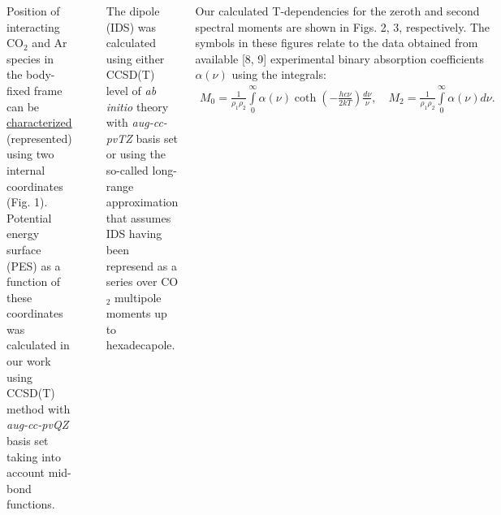 \documentclass[
  20pt,
  a0paper,
  portrait,
  margin=0mm,
  innermargin=15mm,
  blockverticalspace=0mm,
  colspace=0mm,
  subcolspace=0mm
]{tikzposter}
\newcommand{\lb}{\left(}
\newcommand{\rb}{\right)}
\newcommand{\vpravo}{\hspace{1.5cm}}
\newcommand{\vverh}{\vspace*{-0.05cm}}
\begin{document}
\begin{columns}
{{Position of interacting CO$_2$ and Ar species in the body-fixed frame can be \underline{characterized} (represented) using two internal coordinates (Fig. 1). Potential energy surface (PES) as a function of these coordinates was calculated in our work using CCSD(T) method with \textit{aug-cc-pvQZ} basis set taking into account mid-bond functions. \\ 
\begin{minipage}{0.5\linewidth}
\vspace{1cm}
\begin{tikzfigure}
		\includegraphics[width=\linewidth]{../pictures/dipole_pictures/last-crop.pdf}
\end{tikzfigure}
\end{minipage}
\hspace{1cm}
\begin{minipage}{0.45\linewidth}
The dipole (IDS) was calculated using either CCSD(T) level of \textit{ab initio} theory with \textit{aug-cc-pvTZ} basis set or using the so-called long-range approximation that assumes IDS having been represend as a series over CO$_2$ multipole moments up to hexadecapole. 
\end{minipage}

\vspace{0.5cm}
\vpravo Our calculated T-dependencies for the zeroth and second spectral moments are shown in Figs. 2, 3, respectively. The symbols in these figures relate to the data obtained from available [8, 9] experimental binary absorption coefficients $\alpha(\nu)$ using the integrals:
\vverh
\begin{gather}
		M_0 = \frac{1}{\rho_1 \rho_2} \int\limits_{0}^{\infty} \alpha(\nu) \coth \lb - \frac{h c \nu}{2 k T} \rb \frac{d \nu}{\nu}, \quad M_2 = \frac{1}{\rho_1 \rho_2} \int\limits_{0}^{\infty} \alpha(\nu) d \nu. \label{eq:m2_spectra}
\end{gather}

}}
\end{columns}
\end{document}
